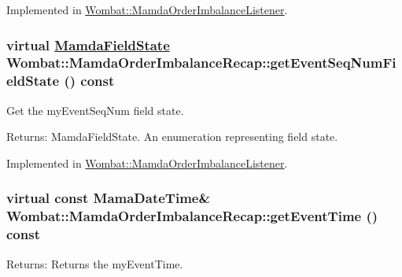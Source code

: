 Implemented in \hyperlink{classWombat_1_1MamdaOrderImbalanceListener_3a6ecd36b855f2e1f122d07764a6b691}{Wombat::Mamda\-Order\-Imbalance\-Listener}.\hypertarget{classWombat_1_1MamdaOrderImbalanceRecap_09091e1441752ff0aaed931532d6fb7d}{
\subsubsection[getEventSeqNumFieldState]{\setlength{\rightskip}{0pt plus 5cm}virtual \hyperlink{namespaceWombat_93aac974f2ab713554fd12a1fa3b7d2a}{Mamda\-Field\-State} Wombat::Mamda\-Order\-Imbalance\-Recap::get\-Event\-Seq\-Num\-Field\-State () const}}
\label{classWombat_1_1MamdaOrderImbalanceRecap_09091e1441752ff0aaed931532d6fb7d}


Get the my\-Event\-Seq\-Num field state. 

\begin{Desc}
\item[Returns:]Mamda\-Field\-State. An enumeration representing field state. \end{Desc}


Implemented in \hyperlink{classWombat_1_1MamdaOrderImbalanceListener_1daae80b39ea6a070f2fa736fe90437d}{Wombat::Mamda\-Order\-Imbalance\-Listener}.\hypertarget{classWombat_1_1MamdaOrderImbalanceRecap_7ee6f3e229298d61cb56b5780795303b}{
\subsubsection[getEventTime]{\setlength{\rightskip}{0pt plus 5cm}virtual const Mama\-Date\-Time\& Wombat::Mamda\-Order\-Imbalance\-Recap::get\-Event\-Time () const}}
\label{classWombat_1_1MamdaOrderImbalanceRecap_7ee6f3e229298d61cb56b5780795303b}


\begin{Desc}
\item[Returns:]Returns the my\-Event\-Time. \end{Desc}


